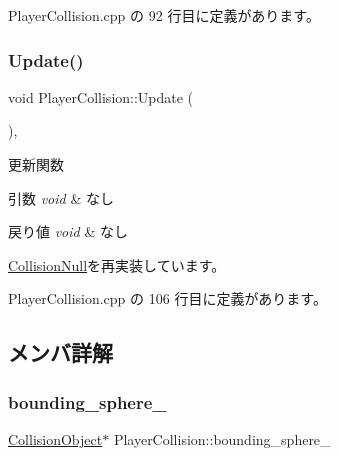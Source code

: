  Player\+Collision.\+cpp の 92 行目に定義があります。

\mbox{\label{class_player_collision_a09f97f220903f5724a3af6b97af3a336}} 
\subsubsection{\texorpdfstring{Update()}{Update()}}
{\footnotesize\ttfamily void Player\+Collision\+::\+Update (\begin{DoxyParamCaption}{ }\end{DoxyParamCaption})\hspace{0.3cm}{\ttfamily [override]}, {\ttfamily [virtual]}}



更新関数 


\begin{DoxyParams}{引数}
{\em void} & なし \\
\hline
\end{DoxyParams}

\begin{DoxyRetVals}{戻り値}
{\em void} & なし \\
\hline
\end{DoxyRetVals}


\mbox{\hyperlink{class_collision_null_a5e5e094e3fbe3ccc0515e485c739bd15}{Collision\+Null}}を再実装しています。



 Player\+Collision.\+cpp の 106 行目に定義があります。



\subsection{メンバ詳解}
\mbox{\label{class_player_collision_adf8368bcd0e09b6ddd8cb2756daf2d48}} 
\subsubsection{\texorpdfstring{bounding\+\_\+sphere\+\_\+}{bounding\_sphere\_}}
{\footnotesize\ttfamily \mbox{\hyperlink{class_collision_object}{Collision\+Object}}$\ast$ Player\+Collision\+::bounding\+\_\+sphere\+\_\+\hspace{0.3cm}{\ttfamily [private]}}



